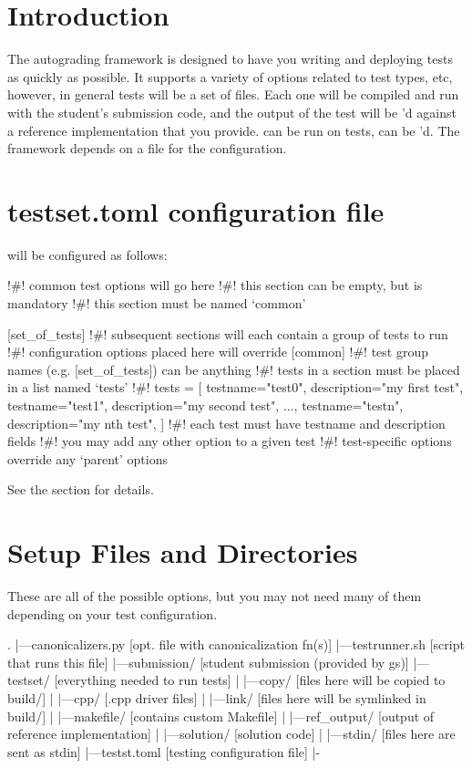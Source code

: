 \documentclass[11pt]{report}
\begin{document}
\section*{Introduction}
The autograding framework is designed to have you writing and deploying tests as quickly as possible. 
It supports a variety of options related to test types, etc, however, in general tests will be a 
set of  files. Each one will be compiled and run with the student's submission code,
and the output of the test will be 'd against a reference implementation that you provide.
 can be run on tests,  can be 'd. The framework depends on a
 file for the configuration. 
\section*{testset.toml configuration file}
 will be configured as follows:
\begin{bashcodeblock}
[common]
!\#! common test options will go here
!\#! this section can be empty, but is mandatory
!\#! this section must be named `common' 

[set_of_tests] 
!\#! subsequent sections will each contain a group of tests to run
!\#! configuration options placed here will override [common]
!\#! test group names (e.g. [set_of_tests]) can be anything
!\#! tests in a section must be placed in a list named `tests'
!\#! tests = [
      {testname="test0", description="my first test"},
      {testname="test1", description="my second test"},
      ..., 
      {testname="testn", description="my nth test"},
]
!\#! each test must have testname and description fields
!\#! you may add any other option to a given test
!\#! test-specific options override any `parent' options
\end{bashcodeblock}
See the section  for details. 

\section*{Setup Files and Directories}
These are all of the possible options, but you may not need many of them 
depending on your test configuration.
\begin{bashcodeblock}
.
|---canonicalizers.py [opt. file with canonicalization fn(s)]
|---testrunner.sh     [script that runs this file]
|---submission/       [student submission (provided by gs)]
|---testset/          [everything needed to run tests]
|   |---copy/         [files here will be copied to build/]
|   |---cpp/          [.cpp driver files]
|   |---link/         [files here will be symlinked in build/]
|   |---makefile/     [contains custom Makefile]
|   |---ref_output/   [output of reference implementation]
|   |---solution/     [solution code]
|   |---stdin/        [files here are sent as stdin]
|---testst.toml       [testing configuration file]
|-
\end{bashcodeblock}
\end{document}
